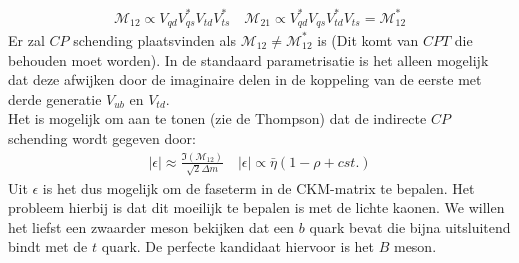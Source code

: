 \documentclass[../main.tex]{subfiles}
\begin{document}
\begin{minipage}[c]{0.5\textwidth}
    \begin{center}
    \end{center}
\end{minipage}
\begin{equation}
    \begin{aligned}
        \label{eq:kaon_osc_tijd_inv}
        \mathcal{M}_{12} \propto V_{q d} V_{q s}^{*} V_{t d} V_{t s}^{*} \quad \mathcal{M}_{21} \propto V_{q d}^{*} V_{q s} V_{t d}^{*} V_{t s}=\mathcal{M}_{12}^{*}
    \end{aligned}
\end{equation}
Er zal $CP$ schending plaatsvinden als $\mathcal{M}_{12} \neq \mathcal{M}_{12}^{*}$ is (Dit komt van $CPT$ die behouden moet worden). In de standaard parametrisatie is het alleen mogelijk dat deze afwijken door de imaginaire delen in de koppeling van de eerste met derde generatie $V_{u b}$ en $V_{t d}$.\\
Het is mogelijk om aan te tonen (zie de Thompson) dat de indirecte $CP$ schending wordt gegeven door:
\begin{equation}
    \begin{aligned}
        \label{eq:direct_cp_viol_kaon}
        |\epsilon| \approx \frac{\Im\left(\mathcal{M}_{12}\right)}{\sqrt{2} \Delta m} \quad|\epsilon| \propto \bar{\eta}(1-\rho+c s t .)
    \end{aligned}
\end{equation}
Uit $\epsilon$ is het dus mogelijk om de faseterm in de CKM-matrix te bepalen. Het probleem hierbij is dat dit moeilijk te bepalen is met de lichte kaonen. We willen het liefst een zwaarder meson bekijken dat een $b$ quark bevat die bijna uitsluitend bindt met de $t$ quark. De perfecte kandidaat hiervoor is het $B$ meson.
\end{document}
